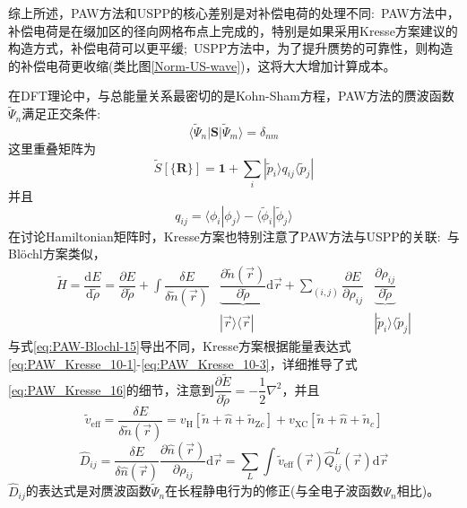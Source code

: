 综上所述，\textrm{PAW}方法和\textrm{USPP}的核心差别是对补偿电荷的处理不同:~\textrm{PAW}方法中，补偿电荷是在缀加区的径向网格布点上完成的，特别是如果采用\textrm{Kresse}方案建议的构造方式，补偿电荷可以更平缓;~\textrm{USPP}方法中，为了提升赝势的可靠性，则构造的补偿电荷更收缩(类比图\ref{Norm-US-wave})，这将大大增加计算成本。

在\textrm{DFT}理论中，与总能量关系最密切的是\textrm{Kohn-Sham}方程，\textrm{PAW}方法的赝波函数$\tilde\Psi_n$满足正交条件:~
	\begin{displaymath}
		\langle\tilde\Psi_n|\mathbf{S}|\tilde\Psi_m\rangle=\delta_{nm}
	\end{displaymath}
这里重叠矩阵为
\begin{equation}
	\tilde S[\{\mathbf{R}\}]=\mathbf{1}+\sum_i|\tilde p_i\rangle q_{ij}\langle\tilde p_j|
	\label{eq:PAW_Kresse_15}
\end{equation}
并且$$q_{ij}=\langle\phi_i|\phi_j\rangle-\langle\tilde\phi_i|\tilde\phi_j\rangle$$
在讨论\textrm{Hamiltonian}矩阵时，\textrm{Kresse}方案也特别注意了\textrm{PAW}方法与\textrm{USPP}的关联:~与\textrm{Bl\"ochl}方案类似，
\begin{equation}
	\begin{aligned}
		\tilde H=\dfrac{\mathrm{d}E}{\mathrm{d}\tilde\rho}=\dfrac{\partial E}{\partial\tilde\rho}+\int\dfrac{\delta E}{\delta\tilde n(\vec r)}&\underbrace{\dfrac{\partial\tilde n(\vec r)}{\partial\tilde\rho}}\mathrm{d}\vec r+\sum_{(i,j)}\dfrac{\partial E}{\partial\rho_{ij}}&\underbrace{\dfrac{\partial\rho_{ij}}{\partial\tilde\rho}}\\
		&|\vec r\rangle\langle\vec r| &|\tilde p_i\rangle\langle\tilde p_j|
	\end{aligned}
	\label{eq:PAW_Kresse_16}
\end{equation}
与式\eqref{eq:PAW-Blochl-15}导出不同，\textrm{Kresse}方案根据能量表达式\eqref{eq:PAW_Kresse_10-1}-\eqref{eq:PAW_Kresse_10-3}，详细推导了式\eqref{eq:PAW_Kresse_16}的细节，注意到$\dfrac{\partial\tilde E}{\partial\tilde\rho}=-\dfrac12\nabla^2$，并且
\begin{displaymath}
	\tilde v_{\mathrm{eff}}=\dfrac{\delta E}{\delta\tilde n(\vec r)}=v_{\mathrm{H}}[\tilde n+\hat n+\tilde n_{\mathrm{Z}c}]+v_{\mathrm{XC}}[\tilde n+\hat n+\tilde n_c]
\end{displaymath}
\begin{displaymath}
	\hat D_{ij}=\dfrac{\delta E}{\delta\hat n(\vec r)}\dfrac{\partial\hat n(\vec r)}{\partial\rho_{ij}}\mathrm{d}\vec r=\sum_L\int\tilde v_{\mathrm{eff}}(\vec r)\hat Q_{ij}^L(\vec r)\mathrm{d}\vec r
\end{displaymath}
$\hat D_{ij}$的表达式是对赝波函数$\tilde\Psi_n$在长程静电行为的修正(与全电子波函数$\Psi_n$相比)。

